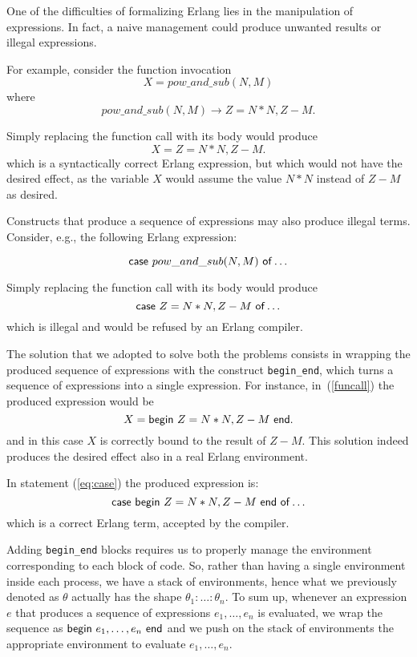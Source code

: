 \documentclass{article}[12pt,a4paper]
\theoremstyle{definition}
\begin{document}
One of the difficulties of formalizing Erlang lies in the manipulation of
expressions. In fact, a naive management could produce unwanted results or illegal
expressions.

For example, consider the function invocation
\begin{equation}\label{funcall}
  X=pow\_and\_sub(N,M) 
\end{equation}
where
\[
  pow\_and\_sub(N,M) \rightarrow Z = N*N, Z-M.
\]

Simply replacing the function call with its body would produce
\[
  X = Z = N*N, Z-M.
\]
which is a syntactically correct Erlang expression, but which would not have the desired effect, as the variable $X$ would assume the
value $N*N$ instead of $Z-M$ as desired.

Constructs that produce a sequence of expressions
may also produce illegal terms. Consider, e.g., the
following Erlang expression:

\begin{equation}\label{eq:case}
  \mathsf{case}~pow\_and\_sub(N,M)~\mathsf{of} \ldots
\end{equation}

Simply replacing the function call with its body would produce 
\[
  \mathsf{case}~Z = N*N, Z-M~\mathsf{of} \ldots
\]
which is illegal and would be refused by an Erlang compiler.

The solution that we adopted to solve both the problems consists in wrapping the produced sequence of
expressions with the construct \verb+begin_end+, which turns a sequence of expressions into a single expression. For instance, in~(\ref{funcall}) the produced expression
would be 
\[
  X = \mathsf{begin}~Z = N*N, Z-M~\mathsf{end}.
\]
and in this case $X$ is correctly bound to the result of $Z-M$. This solution indeed
produces the desired effect also in a real Erlang environment.

In statement (\ref{eq:case}) the produced expression is:
\[
  \mathsf{case}~\mathsf{begin}~Z = N*N, Z-M~\mathsf{end}~\mathsf{of} \ldots
\]
which is a correct Erlang term, accepted by the compiler. 

Adding \verb+begin_end+ blocks
requires us to properly manage the environment
corresponding to each block of code. So, rather than having a single
environment inside each process, we have a stack of environments, hence what we previously denoted as $\theta$ actually has the
shape $\theta_1:\ldots:\theta_n$. To sum up, whenever an expression $e$ that produces a sequence of expressions $e_1,\ldots,e_n$ is evaluated, we wrap
the sequence as $\mathsf{begin}~e_1,\ldots,e_n~\mathsf{end}$ and we push on the stack
of environments the appropriate environment to evaluate $e_1,\ldots,e_n$. 
\end{document}
